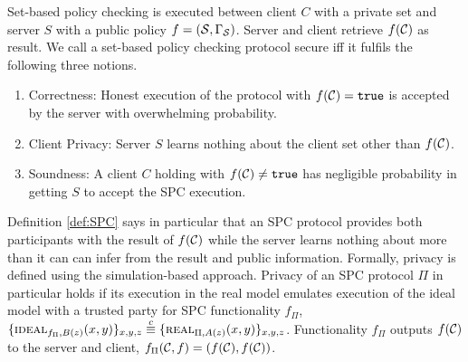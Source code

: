 \begin{definition}\label{def:SPC}
Set-based policy checking is executed between client $C$ with a private set \cC and server $S$ with a public policy $f=(\mathcal{S},\Gamma_\mathcal{S})$.
Server and client retrieve $f(\mathcal{C})$ as result. 
We call a set-based policy checking protocol secure iff it fulfils the following three notions.
\begin{enumerate}
  \item Correctness: Honest execution of the protocol with $f(\mathcal{C})=\mathtt{true}$ is accepted by the server with overwhelming probability.
  \item Client Privacy: Server $S$ learns nothing about the client set \cC other than $f(\mathcal{C})$.
  \item Soundness: A client $C$ holding \cC with $f(\mathcal{C})\not=\mathtt{true}$ has negligible probability in getting $S$ to accept the \ac{SPC} execution. \eod
\end{enumerate}
\end{definition}

\noindent
Definition \ref{def:SPC} says in particular that an \ac{SPC} protocol provides both participants with the result of $f(\mathcal{C})$ while the server learns nothing about \cC more than it can can infer from the result and public information.
Formally, privacy is defined using the simulation-based approach.
Privacy of an \ac{SPC} protocol $\Pi$ in particular holds if its execution in the real model emulates execution of the ideal model with a trusted party for \ac{SPC} functionality $f_\Pi$, \ie
$ \{\IDEAL_{f_\Pi, B(z)}(x, y)\}_{x, y, z} \stackrel{c}{\equiv} \{\REAL_{\Pi, A(z)}(x, y)\}_{x, y, z}$.
Functionality $f_\Pi$ outputs $f(\mathcal{C})$ to the server and client, \ie $f_{\Pi}(\mathcal{C}, f)=(f(\mathcal{C}), f(\mathcal{C}))$.

